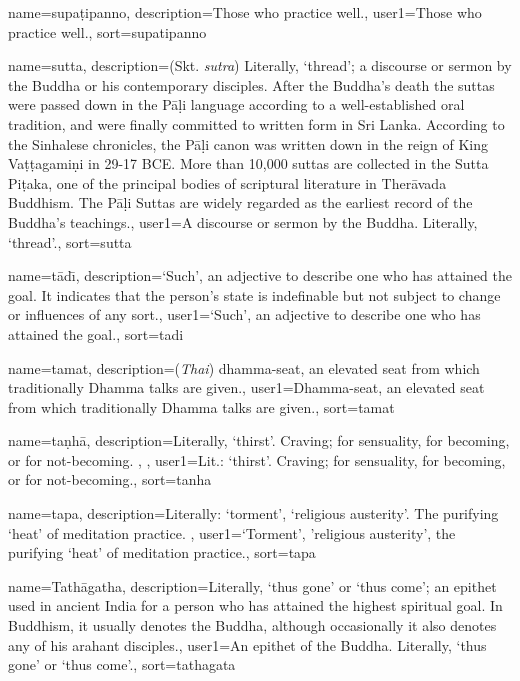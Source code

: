{
name=supa\d{t}ipanno,
description={Those who practice well.},
user1={Those who practice well.},
sort={supatipanno}
}

{
name={sutta},
description={(Skt. \textit{sutra}) Literally, `thread'; a discourse or sermon by the Buddha or his contemporary disciples. After the Buddha's death the suttas were passed down in the P\=a\d{l}i language according to a well-established oral tradition, and were finally committed to written form in Sri Lanka. According to the Sinhalese chronicles, the P\=a\d{l}i canon was written down in the reign of King Va\d{t}\d{t}agami\d{n}i in 29-17 BCE. More than 10,000 suttas are collected in the Sutta Pi\d{t}aka, one of the principal bodies of scriptural literature in Ther\=avada Buddhism. The P\=a\d{l}i Suttas are widely regarded as the earliest record of the Buddha's teachings.},
user1={A discourse or sermon by the Buddha. Literally, `thread'.},
sort={sutta}
}

{
name={t\=ad\={\i}},
description={`Such', an adjective to describe one who has attained the goal. It indicates that the person's state is indefinable but not subject to change or influences of any sort.},
user1={`Such', an adjective to describe one who has attained the goal.},
sort={tadi}
}

{
name=tamat,
description={(\textit{Thai}) dhamma-seat, an elevated seat from which traditionally Dhamma talks are given.},
user1={Dhamma-seat, an elevated seat from which traditionally Dhamma talks are given.},
sort={tamat}
}

{
name={ta\d{n}h\=a},
description={Literally, `thirst'. Craving; for sensuality, for becoming, or for not-becoming. \protect \seepre %
\protect {}, \protect {}%
\protect \seepost %
},
user1={Lit.: `thirst'. Craving; for sensuality, for becoming, or for not-becoming.},
sort={tanha}
}

{
name={tapa},
description={Literally: `torment', `religious austerity'. The purifying `heat' of meditation practice. \protect \seepre %
\protect {}%
\protect \seepost %
},
user1={`Torment', 'religious austerity', the purifying `heat' of meditation practice.},
sort={tapa}
}

{
name={Tath\=agatha},
description={Literally, `thus gone' or `thus come'; an epithet used in ancient India for a person who has attained the highest spiritual goal. In Buddhism, it usually denotes the Buddha, although occasionally it also denotes any of his arahant disciples.},
user1={An epithet of the Buddha. Literally, `thus gone' or `thus come'.},
sort={tathagata}
}

